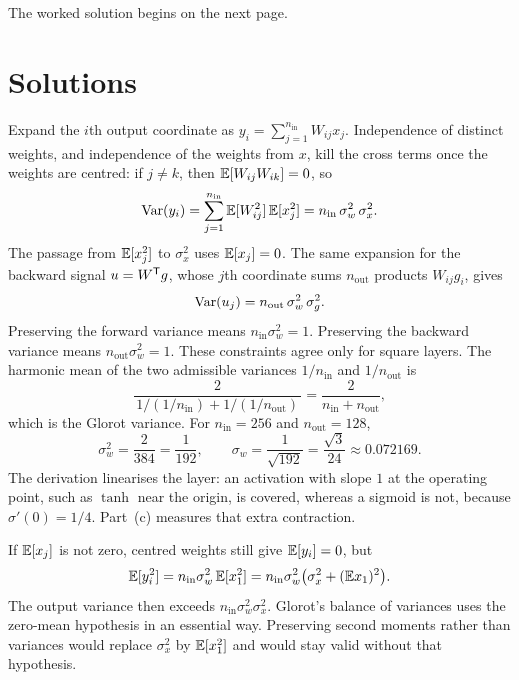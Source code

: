 The worked solution begins on the next page.

\clearpage
\section{Solutions}


Expand the \(i\)th output coordinate as \(y_i = \sum_{j=1}^{n_{\mathrm{in}}} W_{ij} x_j\). Independence of distinct weights, and independence of the weights from \(x\), kill the cross terms once the weights are centred: if \(j\neq k\), then \(\mathbb{E}[W_{ij}W_{ik}]=0\), so
\[
  \operatorname{Var}(y_i)
  =
  \sum_{j=1}^{n_{\mathrm{in}}} \mathbb{E}[W_{ij}^2]\,\mathbb{E}[x_j^2]
  =
  n_{\mathrm{in}}\,\sigma_w^2\,\sigma_x^2.
\]
The passage from \(\mathbb{E}[x_j^2]\) to \(\sigma_x^2\) uses \(\mathbb{E}[x_j]=0\). The same expansion for the backward signal \(u = W^{\mathsf{T}} g\), whose \(j\)th coordinate sums \(n_{\mathrm{out}}\) products \(W_{ij} g_i\), gives
\[
  \operatorname{Var}(u_j) = n_{\mathrm{out}}\,\sigma_w^2\,\sigma_g^2.
\]
Preserving the forward variance means \(n_{\mathrm{in}}\sigma_w^2 = 1\). Preserving the backward variance means \(n_{\mathrm{out}}\sigma_w^2 = 1\). These constraints agree only for square layers. The harmonic mean of the two admissible variances \(1/n_{\mathrm{in}}\) and \(1/n_{\mathrm{out}}\) is
\[
  \frac{2}{\,1/(1/n_{\mathrm{in}}) + 1/(1/n_{\mathrm{out}})\,}
  =
  \frac{2}{n_{\mathrm{in}}+n_{\mathrm{out}}},
\]
which is the Glorot variance. For \(n_{\mathrm{in}}=256\) and \(n_{\mathrm{out}}=128\),
\[
  \sigma_w^2 = \frac{2}{384} = \frac{1}{192},
  \qquad
  \sigma_w = \frac{1}{\sqrt{192}} = \frac{\sqrt{3}}{24} \approx 0.072169.
\]
The derivation linearises the layer: an activation with slope \(1\) at the operating point, such as \(\tanh\) near the origin, is covered, whereas a sigmoid is not, because \(\sigma'(0)=1/4\). Part~(c) measures that extra contraction.

If \(\mathbb{E}[x_j]\) is not zero, centred weights still give \(\mathbb{E}[y_i]=0\), but
\[
  \mathbb{E}[y_i^2]
  =
  n_{\mathrm{in}}\sigma_w^2\,\mathbb{E}[x_1^2]
  =
  n_{\mathrm{in}}\sigma_w^2\bigl(\sigma_x^2 + (\mathbb{E} x_1)^2\bigr).
\]
The output variance then exceeds \(n_{\mathrm{in}}\sigma_w^2\sigma_x^2\). Glorot's balance of variances uses the zero-mean hypothesis in an essential way. Preserving second moments rather than variances would replace \(\sigma_x^2\) by \(\mathbb{E}[x_1^2]\) and would stay valid without that hypothesis.


